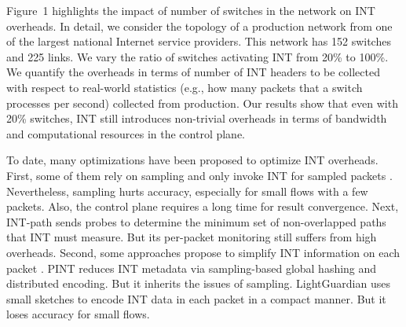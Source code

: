 Figure~1 highlights the impact of number of switches in the network on INT overheads. In detail, we consider the topology of a production network from one of the largest national Internet service providers. This network has 152 switches and 225 links. We vary the ratio of switches activating INT from 20\% to 100\%. We quantify the overheads in terms of number of INT headers to be collected with respect to real-world statistics (e.g., how many packets that a switch processes per second) collected from production. Our results show that even with 20\% switches, INT still introduces non-trivial overheads in terms of bandwidth and computational resources in the control plane. 

To date, many optimizations have been proposed to optimize INT overheads. First, some of them rely on sampling and only invoke INT for sampled packets \cite{tang2019sel,suh2020flexible,kim2018selective,ben2020pint}. Nevertheless, sampling hurts accuracy, especially for small flows with a few packets. Also, the control plane requires a long time for result convergence. Next, INT-path \cite{pan2019int} sends probes to determine the minimum set of non-overlapped paths that INT must measure. But its per-packet monitoring still suffers from high overheads. 
%
Second, some approaches propose to simplify INT information on each packet \cite{ben2020pint,zhao2021lightguardian,sheng2021deltaint}. PINT \cite{ben2020pint} reduces INT metadata via sampling-based global hashing and distributed encoding. But it inherits the issues of sampling. LightGuardian \cite{zhao2021lightguardian} uses small sketches to encode INT data in each packet in a compact manner. But it loses accuracy for small flows. 








